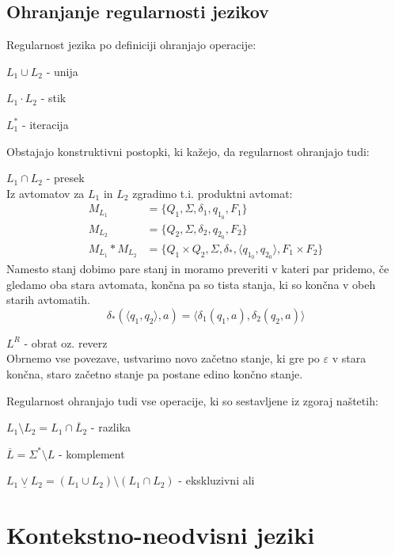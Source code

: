 \documentclass[10pt,a4paper,oneside]{book}
\begin{document}
\section{Ohranjanje regularnosti jezikov}
Regularnost jezika po definiciji ohranjajo operacije:
\begin{items}
\item $L_1 \cup L_2$ - unija 
\item $L_1 \cdot L_2$ - stik 
\item $L_1^*$ - iteracija
\end{items}
Obstajajo konstruktivni postopki, ki kažejo, da regularnost ohranjajo tudi:
\begin{items}
\item $L_1 \cap L_2$ - presek\\
	Iz avtomatov za $L_1$ in $L_2$ zgradimo t.i. produktni avtomat:
		\begin{align*}
			M_{L_1} &= \{ Q_1, \Sigma, \delta_1, q_{1_0}, F_1 \}\\
			M_{L_2} &= \{ Q_2, \Sigma, \delta_2, q_{2_0}, F_2 \}\\
			M_{L_1}*M_{L_2} &= \{ Q_1 \times Q_2, \Sigma, \delta_*, \langle q_{1_0}, q_{2_0} \rangle, F_1 \times F_2 \}
		\end{align*}
	Namesto stanj dobimo pare stanj in moramo preveriti v kateri par pridemo, če gledamo oba stara avtomata, končna pa so tista stanja, ki so končna v obeh starih avtomatih.
	\begin{displaymath}
		\delta_*(\langle q_1, q_2 \rangle, a) = \langle \delta_1(q_1, a), \delta_2(q_2, a)\rangle
	\end{displaymath}
\item $L^R$ - obrat oz. reverz\\
	Obrnemo vse povezave, ustvarimo novo začetno stanje, ki gre po $\varepsilon$ v stara končna, staro začetno stanje pa postane edino končno stanje.
\end{items}
Regularnost ohranjajo tudi vse operacije, ki so sestavljene iz zgoraj naštetih:
\begin{items}
\item $L_1 \setminus L_2 = L_1 \cap \overline L_2$ - razlika
\item $\overline{L} = \Sigma^* \setminus L$ - komplement
\item $L_1 \underline\vee L_2 = (L_1 \cup L_2) \setminus (L_1 \cap L_2)$ - ekskluzivni ali 
\end{items}

\chapter{Kontekstno-neodvisni jeziki}\label{chap:Kontekstno-neodvisni jeziki}
\end{document}
